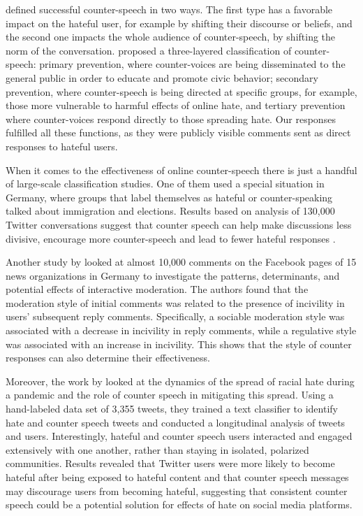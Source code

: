 \documentclass[preprint,12pt]{elsarticle}
\begin{document}
\citet{benesch2016considerations} defined successful counter-speech in two ways. The first type has a favorable impact on the hateful user, for example by shifting their discourse or beliefs, and the second one impacts the whole audience of counter-speech, by shifting the norm of the conversation.  \citep{rieger2018hate} proposed a three-layered classification of counter-speech: primary prevention, where counter-voices are being disseminated to the general public in order to educate and promote civic behavior; secondary prevention, where counter-speech is being directed at specific groups, for example, those more vulnerable to harmful effects of online hate, and tertiary prevention where counter-voices respond directly to those spreading hate. Our responses fulfilled all these functions, as they were publicly visible comments sent as direct responses to hateful users.

When it comes to the effectiveness of online counter-speech there is just a handful of large-scale classification studies. One of them used a special situation in Germany, where groups that label themselves as hateful or counter-speaking talked about immigration and elections. Results based on analysis of 130,000 Twitter conversations suggest that counter speech can help make discussions less divisive, encourage more counter-speech and lead to fewer hateful responses \citep{garland2020countering}. 

Another study by \citet{ziegele2018journalistic} looked at almost 10,000 comments on the Facebook pages of 15 news organizations in Germany to investigate the patterns, determinants, and potential effects of interactive moderation. The authors found that the moderation style of initial comments was related to the presence of incivility in users' subsequent reply comments. Specifically, a sociable moderation style was associated with a decrease in incivility in reply comments, while a regulative style was associated with an increase in incivility. This shows that the style of counter responses can also determine their effectiveness. 

Moreover, the work by \citet{ziems2020racism} looked at the dynamics of the spread of racial hate during a pandemic and the role of counter speech in mitigating this spread. Using a hand-labeled data set of 3,355 tweets, they trained a text classifier to identify hate and counter speech tweets and conducted a longitudinal analysis of tweets and users. Interestingly, hateful and counter speech users interacted and engaged extensively with one another, rather than staying in isolated, polarized communities. Results revealed that Twitter users were more likely to become hateful after being exposed to hateful content and that counter speech messages may discourage users from becoming hateful, suggesting that consistent counter speech could be a potential solution for effects of hate on social media platforms. 
\end{document}
